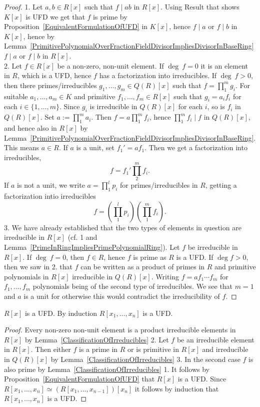 \begin{proof}
    1. Let $a,b\in R[x]$ such that $f\mid ab$ in $R[x]$. Using {\Large Result that shows $K[x]$ is UFD} we get that $f$ is prime by Proposition~\ref{EquivalentFormulationOfUFD} in $K[x]$, hence $f \mid a$ or $f \mid b$ in $K[x]$, hence by Lemma~\ref{PrimitivePolynomialOverFractionFieldDivisorImpliesDivisorInBaseRing} $f\mid a$ or $f\mid b$ in $R[x]$.\\
    2. Let $f\in R[x]$ be a non-zero, non-unit element. If $\deg \ f =0$ it is an element in $R$, which is a UFD, hence $f$ has a factorization into irreducibles. If $\deg \ f>0$, then there primes/irreducibles $g_1,\dots,g_m\in Q(R)[x]$ such that $f = \prod_1^m g_i$. For suitable $a_1,\dots,a_m\in K$ and primitive $f_1,\dots,f_m\in R[x]$ such that $g_i = a_if_i$ for each $i\in\{1,\dots,m\}$. Since $g_i$ is irreducible in $Q(R)[x]$ for each $i$, so is $f_i$ in $Q(R)[x]$. Set $a := \prod_1^m a_i$. Then $f = a\prod_1^m f_i$, hence $\prod_1^m f_i \mid f$ in $Q(R)[x]$, and hence also in $R[x]$ by Lemma~\ref{PrimitivePolynomialOverFractionFieldDivisorImpliesDivisorInBaseRing}. This means $a \in R$. If $a$ is a unit, set $f_1' = af_1$. Then we get a factorization into irreducibles,
    $$f = f_1'\prod_2^mf_i.$$
    If $a$ is not a unit, we write $a = \prod_1^l p_i$ for primes/irreducibles in $R$, getting a factorization intio irreducibles
    $$f = \left(\prod_1^l p_i \right)\left(\prod_1^m f_i\right).$$
    3. We have already established that the two types of elements in question are irreducible in $R[x]$ (cf. 1 and Lemma~\ref{PrimeInRingImpliesPrimePolynomialRing}). Let $f$ be irreducible in $R[x]$. If $\deg\ f = 0$, then $f\in R$, hence $f$ is prime as $R$ is a UFD. If $\deg f>0$, then we saw in 2. that  $f$ can be written as a product of primes in $R$ and primitive polynomials in $R[x]$ irreducible in $Q(R)[x]$. Writing $f = a f_1\cdots f_m $ for $f_1,\dots,f_m$ polynomials being of the second type of irreducibles. We see that $m=1$ and $a$ is a unit for otherwise this would contradict the irreducibility of $f$.   
\end{proof}
\begin{theorem}
    $R[x]$ is a UFD. By induction $R[x_1,\dots,x_n]$ is a UFD.
\end{theorem}
\begin{proof}
    Every non-zero non-unit element is a product irreducible elements in $R[x]$ by Lemma~\ref{ClassificationOfIrreducibles} 2. Let $f$ be an irreducible element in $R[x]$. Then either $f$ is a prime in $R$ or is primitive in $R[x]$ and irreducible in $Q(R)[x]$ by Lemma~\ref{ClassificationOfIrreducibles} 3. In the second case $f$ is also prime by Lemma~\ref{ClassificationOfIrreducibles} 1. It follows by Proposition~\ref{EquivalentFormulationOfUFD} that $R[x]$ is a UFD. Since $R[x_1,\dots,x_{n}]\simeq (R[x_1,\dots,x_{n-1}])[x_n]$ it follows by induction that $R[x_1,\dots,x_n]$ is a UFD. 
\end{proof}
